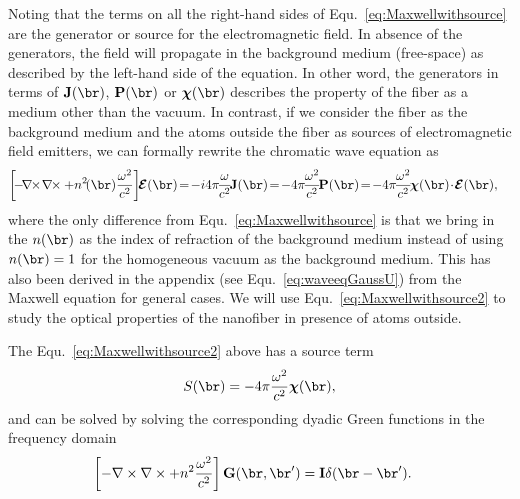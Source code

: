 \documentclass[]{report}
\begin{document}
Noting that the terms on all the right-hand sides of Equ.~\eqref{eq:Maxwellwithsource} are the generator or source for the electromagnetic field. In absence of the generators, the field will propagate in the background medium (free-space) as described by the left-hand side of the equation. In other word, the generators in terms of $ \mathbf{J}(\br) $, $ \mathbf{P}(\br) $ or $ \boldsymbol{\chi}(\br) $ describes the property of the fiber as a medium other than the vacuum. In contrast, if we consider the fiber as the background medium and the atoms outside the fiber as sources of electromagnetic field emitters, we can formally rewrite the chromatic wave equation as 
\begin{align}\label{eq:Maxwellwithsource2}
\left[\! -\! \nabla\!\!\times\!\nabla\!\!\times + n^2\!(\br)\frac{\omega^2}{c^2} \right]\!\! \boldsymbol{\mathcal{E}}(\br) &\!=\! -i4\pi\! \frac{\omega}{c^2}\! \mathbf{J}(\br) \!=\! -4\pi\! \frac{\omega^2}{c^2}\! \mathbf{P}(\br)\!=\! -4\pi\! \frac{\omega^2}{c^2}\! \boldsymbol{\chi}(\br)\! \cdot\! \boldsymbol{\mathcal{E}}(\br),
\end{align}
where the only difference from Equ.~\eqref{eq:Maxwellwithsource} is that we bring in the $ n(\br) $ as the index of refraction of the background medium instead of using $ n(\br)=1 $ for the homogeneous vacuum as the background medium. This has also been derived in the appendix (see Equ.~\eqref{eq:waveeqGaussU}) from the Maxwell equation for general cases. We will use Equ.~\eqref{eq:Maxwellwithsource2} to study the optical properties of the nanofiber in presence of atoms outside. 

The Equ.~\eqref{eq:Maxwellwithsource2} above has a source term 
\begin{align}
S(\br)=-4\pi \frac{\omega^2}{c^2} \boldsymbol{\chi}(\br),%
\end{align}
and can be solved by solving the corresponding dyadic Green functions in the frequency domain
\begin{align}
\left[ -\nabla\times\nabla\times + n^2\frac{\omega^2}{c^2} \right] \mathbf{G}(\br,\br') &= \mathbf{I}\delta(\br-\br'). \label{eq:dyadicGF}
\end{align}
\end{document}
